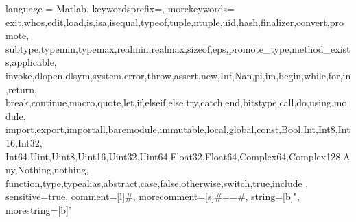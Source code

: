 
%
{ language = Matlab,%
    keywordsprefix=\@,%
    morekeywords={
    exit,whos,edit,load,is,isa,isequal,typeof,tuple,ntuple,uid,hash,finalizer,convert,promote,
    subtype,typemin,typemax,realmin,realmax,sizeof,eps,promote_type,method_exists,applicable,
    invoke,dlopen,dlsym,system,error,throw,assert,new,Inf,Nan,pi,im,begin,while,for,in,return,
    break,continue,macro,quote,let,if,elseif,else,try,catch,end,bitstype,call,do,using,module,
    import,export,importall,baremodule,immutable,local,global,const,Bool,Int,Int8,Int16,Int32,
    Int64,Uint,Uint8,Uint16,Uint32,Uint64,Float32,Float64,Complex64,Complex128,Any,Nothing,nothing,
    function,type,typealias,abstract,case,false,otherwise,switch,true,include
  },%
  sensitive=true, %
  comment=[l]{\#}, %
  morecomment=[s]{\#=}{=\#}, %
  string=[b]", %
  morestring=[b]' %
}

